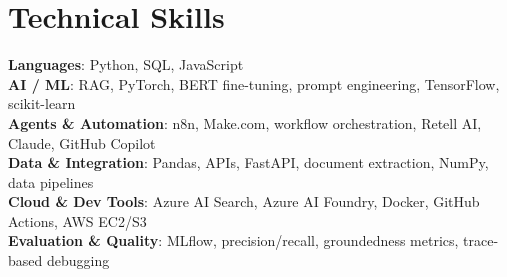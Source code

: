 \documentclass[letterpaper,11pt]{article}
\begin{document}
\section{Technical Skills}
 \begin{itemize}[leftmargin=0.15in, label={}]
    \small{\item{
     \textbf{Languages}{: Python, SQL, JavaScript} \\
     \textbf{AI / ML}{: RAG, PyTorch, BERT fine-tuning, prompt engineering, TensorFlow, scikit-learn} \\
     \textbf{Agents \& Automation}{: n8n, Make.com, workflow orchestration, Retell AI, Claude, GitHub Copilot} \\
     \textbf{Data \& Integration}{: Pandas, APIs, FastAPI, document extraction, NumPy, data pipelines} \\
     \textbf{Cloud \& Dev Tools}{: Azure AI Search, Azure AI Foundry, Docker, GitHub Actions, AWS EC2/S3} \\
     \textbf{Evaluation \& Quality}{: MLflow, precision/recall, groundedness metrics, trace-based debugging}

    }}
 \end{itemize}
\end{document}
